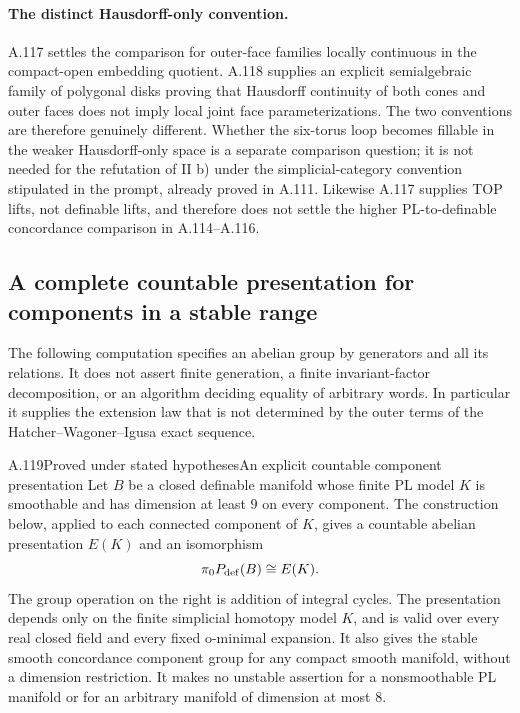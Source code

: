 \paragraph{The distinct Hausdorff-only convention.}
A.117 settles the comparison for outer-face families locally continuous
in the compact-open embedding quotient. A.118 supplies an explicit
semialgebraic family of polygonal disks proving that Hausdorff
continuity of both cones and outer faces does not imply local joint
face parameterizations. The two conventions are therefore genuinely
different. Whether the six-torus loop becomes fillable in the weaker
Hausdorff-only space is a separate comparison question; it is not
needed for the refutation of II b) under the simplicial-category
convention stipulated in the prompt, already proved in A.111.
Likewise A.117 supplies TOP lifts, not definable lifts, and therefore
does not settle the higher PL-to-definable concordance comparison in
A.114--A.116.


\subsection{A complete countable presentation for components in a stable range}

The following computation specifies an abelian group by generators and
all its relations. It does not assert finite generation, a finite
invariant-factor decomposition, or an algorithm deciding equality of
arbitrary words. In particular it supplies the extension law that is
not determined by the outer terms of the Hatcher--Wagoner--Igusa exact
sequence.

\begin{saresult}{A.119}{Proved under stated hypotheses}{An explicit countable component presentation}
Let $B$ be a closed definable manifold whose finite PL model $K$ is
smoothable and has dimension at least $9$ on every component. The
construction below, applied to each connected component of $K$, gives
a countable abelian presentation $E(K)$ and an isomorphism
\[
                   \pi_0P_{\rm def}(B)\cong E(K).
\]
The group operation on the right is addition of integral cycles. The
presentation depends only on the finite simplicial homotopy model $K$,
and is valid over every real closed field and every fixed o-minimal
expansion. It also gives the stable smooth concordance component group
for any compact smooth manifold, without a dimension restriction.
It makes no unstable assertion for a nonsmoothable PL manifold or for
an arbitrary manifold of dimension at most $8$.
\end{saresult}

